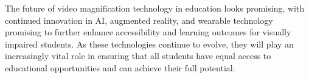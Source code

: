The future of video magnification technology in education looks promising, with continued innovation in AI, augmented reality, and wearable technology promising to further enhance accessibility and learning outcomes for visually impaired students. As these technologies continue to evolve, they will play an increasingly vital role in ensuring that all students have equal access to educational opportunities and can achieve their full potential.

